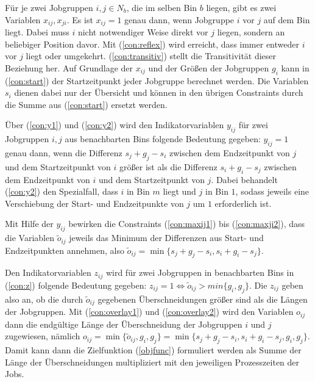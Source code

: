 \documentclass{article}
\begin{document}
%
Für je zwei Jobgruppen $i,j\in N_b$, die im selben Bin $b$ liegen, gibt es
zwei Variablen $x_{ij},x_{ji}$. Es ist $x_{ij}=1$ genau dann, wenn 
Jobgruppe $i$ vor $j$ auf dem Bin liegt. Dabei muss $i$ nicht notwendiger
Weise direkt vor $j$ liegen, sondern an beliebiger Position davor.
Mit (\ref{con:reflex}) wird erreicht, dass immer entweder $i$ vor $j$ liegt
oder umgekehrt. (\ref{con:transitiv}) stellt die Transitivität dieser Beziehung
her. Auf Grundlage der $x_{ij}$ und der Größen der Jobgruppen $g_i$ 
kann in (\ref{con:start}) der Startzeitpunkt jeder Jobgruppe berechnet werden.
Die Variablen $s_i$ dienen dabei nur der Übersicht und können in den übrigen 
Constraints durch die Summe aus (\ref{con:start}) ersetzt werden.

Über (\ref{con:y1}) und (\ref{con:y2}) wird den Indikatorvariablen $y_{ij}$ für
zwei Jobgruppen $i,j$ aus benachbarten Bins folgende
Bedeutung gegeben: $y_{ij}=1$ genau dann, wenn die Differenz $s_j+g_j-s_i$ zwischen dem
Endzeitpunkt von $j$ und dem Startzeitpunkt von $i$ größer ist als
die Differenz $s_i+g_i-s_j$ zwischen dem Endzeitpunkt von $i$ und dem Startzeitpunkt von $j$.
Dabei behandelt (\ref{con:y2}) den Spezialfall, dass $i$ in Bin $m$ liegt und
$j$ in Bin $1$, sodass jeweils eine Verschiebung der Start- und Endzeitpunkte
von $j$ um $1$ erforderlich ist.

Mit Hilfe der $y_{ij}$ bewirken die Constraints (\ref{con:maxij1}) bis
(\ref{con:maxji2}), dass die Variablen $\tilde{o}_{ij}$ jeweils das Minimum
der Differenzen aus Start- und Endzeitpunkten annehmen, also
$\tilde{o}_{ij}=\min\{s_j+g_j-s_i, s_i+g_i-s_j\}$.

Den Indikatorvariablen $z_{ij}$ wird für zwei Jobgruppen in benachbarten Bins
in (\ref{con:z}) folgende Bedeutung gegeben:
$z_{ij}=1 \iff \tilde{o}_{ij} > min\{g_i,g_j\}$. Die $z_{ij}$ geben also an, ob die
durch $\tilde{o}_{ij}$ gegebenen Überschneidungen größer sind als die Längen
der Jobgruppen. Mit (\ref{con:overlay1}) und (\ref{con:overlay2}) wird den
Variablen $o_{ij}$ dann die endgültige Länge der Überschneidung der Jobgruppen
$i$ und $j$ zugewiesen, nämlich 
$o_{ij} = \min\{\tilde{o}_{ij},g_i,g_j\} = \min\{s_j+g_j-s_i,s_i+g_i-s_j,g_i,g_j\}$.
Damit kann dann die Zielfunktion (\ref{objfunc}) formuliert werden als Summe
der Länge der Überschneidungen multipliziert mit den jeweiligen Prozesszeiten
der Jobs.
\end{document}
